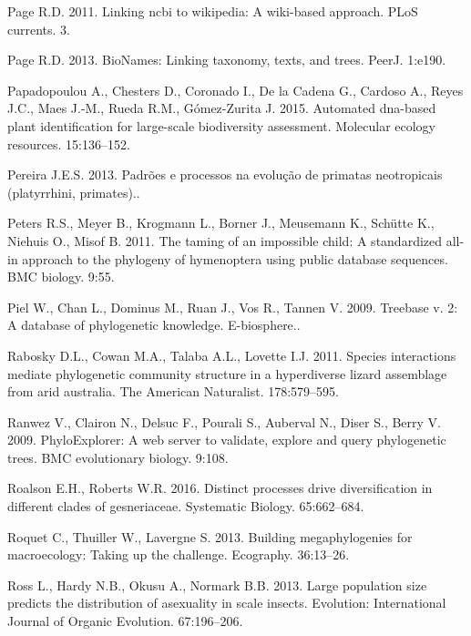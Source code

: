 \documentclass[]{article}
\begin{document}
\leavevmode\hypertarget{ref-page2011linking}{}%
Page R.D. 2011. Linking ncbi to wikipedia: A wiki-based approach. PLoS currents. 3.

\leavevmode\hypertarget{ref-page2013bionames}{}%
Page R.D. 2013. BioNames: Linking taxonomy, texts, and trees. PeerJ. 1:e190.

\leavevmode\hypertarget{ref-papadopoulou2015automated}{}%
Papadopoulou A., Chesters D., Coronado I., De la Cadena G., Cardoso A., Reyes J.C., Maes J.-M., Rueda R.M., Gómez-Zurita J. 2015. Automated dna-based plant identification for large-scale biodiversity assessment. Molecular ecology resources. 15:136--152.

\leavevmode\hypertarget{ref-pereira2013padroes}{}%
Pereira J.E.S. 2013. Padrões e processos na evolução de primatas neotropicais (platyrrhini, primates)..

\leavevmode\hypertarget{ref-peters2011taming}{}%
Peters R.S., Meyer B., Krogmann L., Borner J., Meusemann K., Schütte K., Niehuis O., Misof B. 2011. The taming of an impossible child: A standardized all-in approach to the phylogeny of hymenoptera using public database sequences. BMC biology. 9:55.

\leavevmode\hypertarget{ref-piel2009treebase}{}%
Piel W., Chan L., Dominus M., Ruan J., Vos R., Tannen V. 2009. Treebase v. 2: A database of phylogenetic knowledge. E-biosphere..

\leavevmode\hypertarget{ref-rabosky2011species}{}%
Rabosky D.L., Cowan M.A., Talaba A.L., Lovette I.J. 2011. Species interactions mediate phylogenetic community structure in a hyperdiverse lizard assemblage from arid australia. The American Naturalist. 178:579--595.

\leavevmode\hypertarget{ref-ranwez2009phyloexplorer}{}%
Ranwez V., Clairon N., Delsuc F., Pourali S., Auberval N., Diser S., Berry V. 2009. PhyloExplorer: A web server to validate, explore and query phylogenetic trees. BMC evolutionary biology. 9:108.

\leavevmode\hypertarget{ref-roalson2016distinct}{}%
Roalson E.H., Roberts W.R. 2016. Distinct processes drive diversification in different clades of gesneriaceae. Systematic Biology. 65:662--684.

\leavevmode\hypertarget{ref-roquet2013building}{}%
Roquet C., Thuiller W., Lavergne S. 2013. Building megaphylogenies for macroecology: Taking up the challenge. Ecography. 36:13--26.

\leavevmode\hypertarget{ref-ross2013large}{}%
Ross L., Hardy N.B., Okusu A., Normark B.B. 2013. Large population size predicts the distribution of asexuality in scale insects. Evolution: International Journal of Organic Evolution. 67:196--206.
\end{document}
